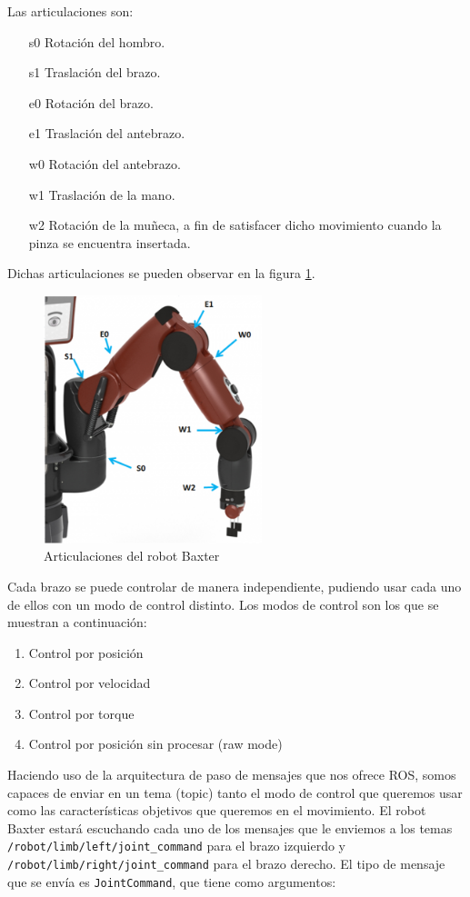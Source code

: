 Las articulaciones son:

\begin{itemize}
\item[s0] Rotación del hombro.
\item[s1] Traslación del brazo.
\item[e0] Rotación del brazo.
\item[e1] Traslación del antebrazo.
\item[w0] Rotación del antebrazo.
\item[w1] Traslación de la mano.
\item[w2] Rotación de la muñeca, a fin de satisfacer dicho movimiento cuando la pinza se encuentra insertada.
\end{itemize}

Dichas articulaciones se pueden observar en la figura \ref{fig:desarrollo/joints}.

\begin{figure}[]
	\centering
	\includegraphics[width=2.5in]{imagenes/metodos/baxter_joint_names.png}
	\caption{Articulaciones del robot Baxter}
	\label{fig:desarrollo/joints}
\end{figure}

Cada brazo se puede controlar de manera independiente, pudiendo usar cada uno de ellos con un modo de control distinto. Los modos de control son los que se muestran a continuación:

\begin{enumerate}
\item Control por posición
\item Control por velocidad
\item Control por torque
\item Control por posición sin procesar (raw mode)
\end{enumerate}

Haciendo uso de la arquitectura de paso de mensajes que nos ofrece ROS, somos capaces de enviar en un tema (topic) tanto el modo de control que queremos usar como las características objetivos que queremos en el movimiento. El robot Baxter estará escuchando cada uno de los mensajes que le enviemos a los temas \verb|/robot/limb/left/joint_command| para el brazo izquierdo y \verb|/robot/limb/right/joint_command| para el brazo derecho. El tipo de mensaje que se envía es \verb|JointCommand|, que tiene como argumentos:

